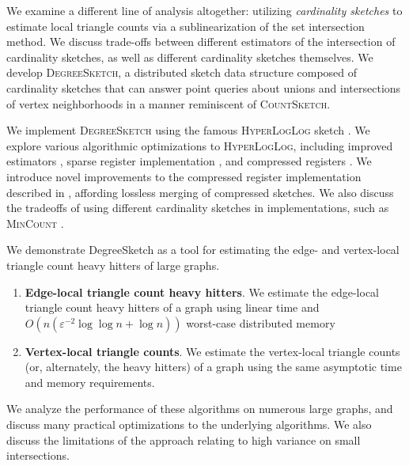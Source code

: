 \documentclass{report}
\newcommand{\algoname}[1]{\textnormal{\textsc{#1}}}
\begin{document}
We examine a different line of analysis altogether: utilizing \emph{cardinality sketches} to estimate local triangle counts via a sublinearization of the set intersection method.
We discuss trade-offs between different estimators of the intersection of cardinality sketches, as well as different cardinality sketches themselves.
We develop \algoname{DegreeSketch}, a distributed sketch data structure composed of cardinality sketches that can answer point queries about unions and intersections of vertex neighborhoods in a manner reminiscent of \algoname{CountSketch}.

We implement \algoname{DegreeSketch} using the famous \algoname{HyperLogLog} sketch \cite{flajolet2007hyperloglog}. 
We explore various algorithmic optimizations to \algoname{HyperLogLog}, including improved estimators \cite{heule2013hyperloglog, qin2016loglog, lang2017back, ertl2017new}, sparse register implementation \cite{heule2013hyperloglog}, and compressed registers \cite{xiao2017better}.
We introduce novel improvements to the compressed register implementation described in \cite{xiao2017better}, affording lossless merging of compressed sketches.
We also discuss the tradeoffs of using different cardinality sketches in implementations, such as \algoname{MinCount} \cite{giroire2009order}.

We demonstrate DegreeSketch as a tool for estimating the edge- and vertex-local triangle count heavy hitters of large graphs. 
%
\begin{enumerate}
	\item \textbf{Edge-local triangle count heavy hitters}. We estimate the edge-local triangle count heavy hitters of a graph using linear time and $O(n (\varepsilon^{-2} \log\log n + \log n))$ worst-case distributed memory
	\item \textbf{Vertex-local triangle counts}. We estimate the vertex-local triangle counts (or, alternately, the heavy hitters) of a graph using the same asymptotic time and memory requirements.
\end{enumerate}
%
We analyze the performance of these algorithms on numerous large graphs, and discuss many practical optimizations to the underlying algorithms. 
We also discuss the limitations of the approach relating to high variance on small intersections.
\end{document}
